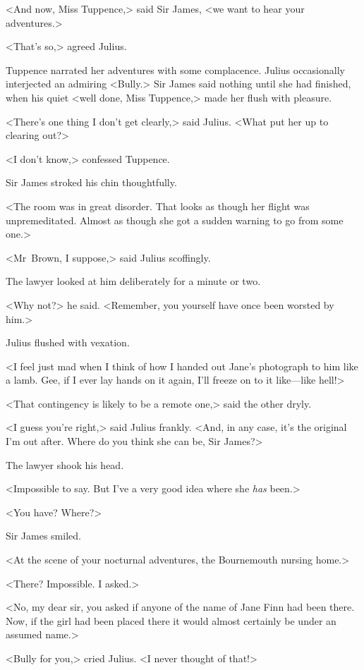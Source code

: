<And now, Miss Tuppence,> said Sir James, <we want to hear your adventures.>

<That's so,> agreed Julius.

Tuppence narrated her adventures with some complacence. Julius occasionally interjected an admiring <Bully.> Sir James said nothing until she had finished, when his quiet <well done, Miss Tuppence,> made her flush with pleasure.

<There's one thing I don't get clearly,> said Julius. <What put her up to clearing out?>

<I don't know,> confessed Tuppence.

Sir James stroked his chin thoughtfully.

<The room was in great disorder. That looks as though her flight was unpremeditated. Almost as though she got a sudden warning to go from some one.>

<Mr~Brown, I suppose,> said Julius scoffingly.

The lawyer looked at him deliberately for a minute or two.

<Why not?> he said. <Remember, you yourself have once been worsted by him.>

Julius flushed with vexation.

<I feel just mad when I think of how I handed out Jane's photograph to him like a lamb. Gee, if I ever lay hands on it again, I'll freeze on to it like—like hell!>

<That contingency is likely to be a remote one,> said the other dryly.

<I guess you're right,> said Julius frankly. <And, in any case, it's the original I'm out after. Where do you think she can be, Sir James?>

The lawyer shook his head.

<Impossible to say. But I've a very good idea where she \emph{has} been.>

<You have? Where?>

Sir James smiled.

<At the scene of your nocturnal adventures, the Bournemouth nursing home.>

<There? Impossible. I asked.>

<No, my dear sir, you asked if anyone of the name of Jane Finn had been there. Now, if the girl had been placed there it would almost certainly be under an assumed name.>

<Bully for you,> cried Julius. <I never thought of that!>

